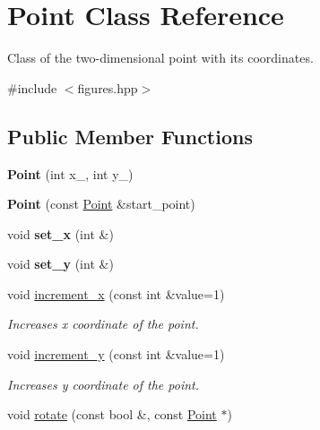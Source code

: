 \hypertarget{classPoint}{}\section{Point Class Reference}
\label{classPoint}


Class of the two-\/dimensional point with its coordinates.  




{\ttfamily \#include $<$figures.\+hpp$>$}

\subsection*{Public Member Functions}
\begin{DoxyCompactItemize}
\item 
\mbox{\label{classPoint_a4236ca5c50e800970c97974d085fe363}} 
{\bfseries Point} (int x\+\_, int y\+\_)
\item 
\mbox{\label{classPoint_ad791bdda02d670830ee8df4fc4c3e61e}} 
{\bfseries Point} (const \hyperlink{classPoint}{Point} \&start\+\_\+point)
\item 
\mbox{\label{classPoint_af4825d922cb65ca462daa78f759b98d6}} 
void {\bfseries set\+\_\+x} (int \&)
\item 
\mbox{\label{classPoint_a8f33fdd9bf4ac61c123fe60a6af84823}} 
void {\bfseries set\+\_\+y} (int \&)
\item 
void \hyperlink{classPoint_a0fdf91327c2be8c48dd07dfe4106e890}{increment\+\_\+x} (const int \&value=1)
\begin{DoxyCompactList}\small\item\em Increases x coordinate of the point. \end{DoxyCompactList}\item 
void \hyperlink{classPoint_aa72c0088d3484f7947f2ceaf51f403b3}{increment\+\_\+y} (const int \&value=1)
\begin{DoxyCompactList}\small\item\em Increases y coordinate of the point. \end{DoxyCompactList}\item 
\mbox{\label{classPoint_abcf915f7c6afaa92e574b561a46bc1e1}} 
void \hyperlink{classPoint_abcf915f7c6afaa92e574b561a46bc1e1}{rotate} (const bool \&, const \hyperlink{classPoint}{Point} $\ast$)

\end{DoxyCompactItemize}
